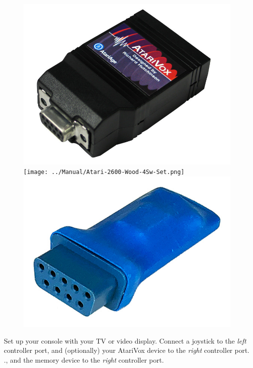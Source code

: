 \documentclass[10pt,twocolumn,openany,article]{memoir}
\begin{document}
\ifdefined\NOSAVE\else
\begin{figure}[b]
  \begin{center}
    \includegraphics[width=\columnwidth]{../Manual/AtariVox.jpeg}
    \ifdefined\ATARIAGESAVE
    \texttt{[image: ../Manual/Atari-2600-Wood-4Sw-Set.png]}
    \else
    \includegraphics[width=\columnwidth]{../Manual/SaveKey.jpeg}
    \fi
  \end{center}
\end{figure}
\fi

Set up your console with your TV or video display. Connect a joystick to
the \emph{left} controller port\ifdefined\ATARIAGESAVE, and (optionally)
your   AtariVox   device   to    the   \emph{right}   controller   port.
\else\ifdefined\NOSAVE.\else{},   and   the   memory   device   to   the
\emph{right} controller port.
\end{document}
